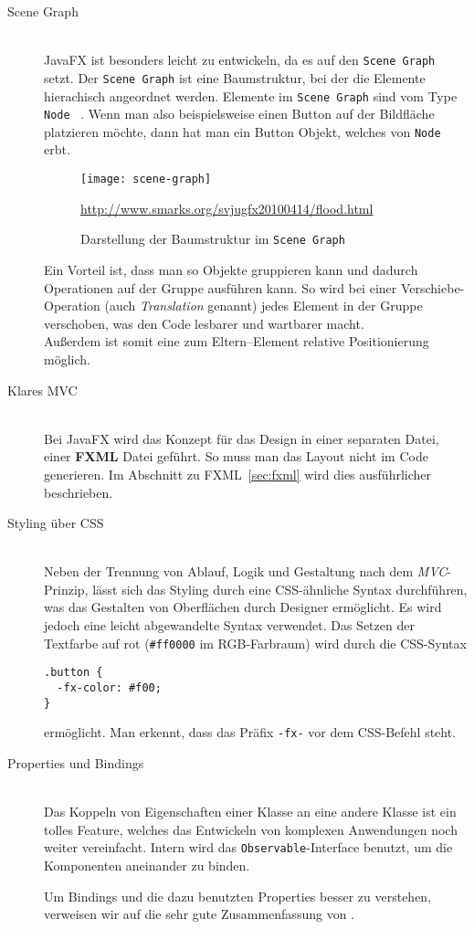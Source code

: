 \begin{description}
\item[Scene Graph]\hfill\\
JavaFX ist besonders leicht zu entwickeln, da es auf den \texttt{Scene Graph} setzt. Der \texttt{Scene Graph} ist eine Baumstruktur, bei der die Elemente hierachisch angeordnet werden. Elemente im \texttt{Scene Graph} sind vom Type \texttt{Node} ~\cite{ProJavaFX8}. Wenn man also beispielsweise einen Button auf der Bildfläche platzieren möchte, dann hat man ein Button Objekt, welches von \texttt{Node} erbt.

\begin{figure}[!htb]
    \centering
      \texttt{[image: scene-graph]}
    \caption{Darstellung der Baumstruktur im \texttt{Scene Graph}}{\url{http://www.smarks.org/svjugfx20100414/flood.html}}
    \label{fig:scene-graph}
\end{figure}

Ein Vorteil ist, dass man so Objekte gruppieren kann und dadurch Operationen auf der Gruppe ausführen kann. So wird bei einer Verschiebe-Operation (auch \textit{Translation} genannt) jedes Element in der Gruppe verschoben, was den Code lesbarer und wartbarer macht.\\
Außerdem ist somit eine zum Eltern--Element relative Positionierung möglich.

\item[Klares MVC]\hfill\\
Bei JavaFX wird das Konzept für das Design in einer separaten Datei, einer \textbf{FXML} Datei geführt. So muss man das Layout nicht im Code generieren. Im Abschnitt zu FXML~\ref{sec:fxml} wird dies ausführlicher beschrieben.

\item[Styling über CSS]\hfill\\
Neben der Trennung von Ablauf, Logik und Gestaltung nach dem \textit{MVC}-Prinzip, lässt sich das Styling durch eine CSS-ähnliche Syntax durchführen, was das Gestalten von Oberflächen durch Designer ermöglicht. Es wird jedoch eine leicht abgewandelte Syntax verwendet. Das Setzen der Textfarbe auf rot (\texttt{\#ff0000} im RGB-Farbraum) wird durch die CSS-Syntax
\begin{verbatim}
.button {
  -fx-color: #f00;
}
\end{verbatim}
ermöglicht. Man erkennt, dass das Präfix \texttt{-fx-} vor dem CSS-Befehl steht.

\item[Properties und Bindings]\hfill\\
Das Koppeln von Eigenschaften einer Klasse an eine andere Klasse ist ein tolles Feature, welches das Entwickeln von komplexen Anwendungen noch weiter vereinfacht. Intern wird das \texttt{Observable}-Interface benutzt, um die Komponenten aneinander zu binden.

Um Bindings und die dazu benutzten Properties besser zu verstehen, verweisen wir auf die sehr gute Zusammenfassung von \cite{JavaBeginner-Binding}.
\end{description}

